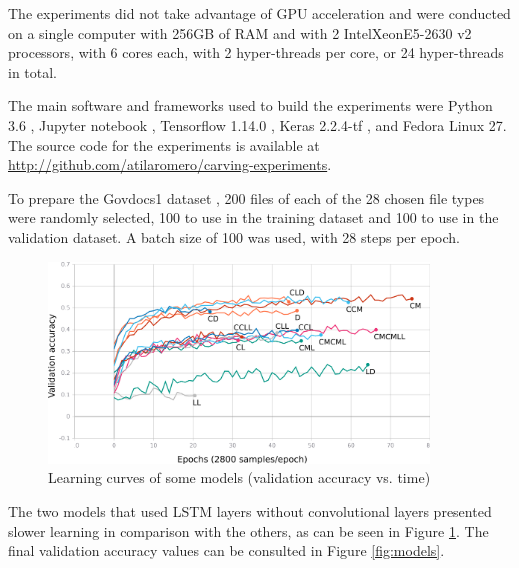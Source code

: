 The experiments did not take advantage of GPU acceleration and were  conducted on a single computer with 256GB of RAM and with 2 Intel\textregistered Xeon\textregistered E5-2630 v2 processors, with 6 cores each, with 2 hyper-threads per core, or 24 hyper-threads in total. 

The main software and frameworks used to build the experiments were Python 3.6 \cite{rossum_python_2019}, Jupyter notebook \cite{perez_jupyter_2019}, Tensorflow 1.14.0 \cite{google_brain_tensorflow_2019}, Keras 2.2.4-tf \cite{chollet_keras_2019}, and Fedora Linux 27.
The source code for the experiments is available at \sloppy\url{http://github.com/atilaromero/carving-experiments}.

To prepare the Govdocs1 dataset \cite{garfinkel_bringing_2009}, 200 files of each of the 28 chosen file types were randomly selected, 100 to use in the training dataset and 100 to use in the validation dataset.
A batch size of 100 was used, with 28 steps per epoch.

\noindent
\begin{figure}[htb!]
\centering\includegraphics[width=0.9\textwidth]{content/epoch_val_categorical_accuracy.png}
\caption{\label{fig:learning}Learning curves of some models (validation accuracy vs. time)}%
\end{figure}

The two models that used LSTM layers without convolutional layers presented slower learning in comparison with the others, as can be seen in Figure \ref{fig:learning}. The final validation accuracy values can be consulted in Figure \ref{fig:models}.

